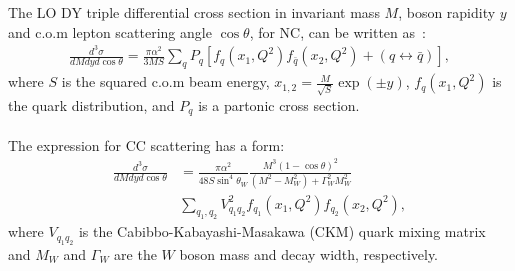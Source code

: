 The LO DY triple differential cross section in
invariant mass \(M\), boson rapidity \(y\) and c.o.m 
lepton scattering  angle \(\cos\theta\), for NC, 
can be written as~\cite{Drell:1970wh,Yamada:1981mw}:
\begin{align}
 \textstyle
 \frac{d^3\sigma}{dM{d}y d\cos\theta} =  
 \frac{\pi\alpha^2}{3MS}\sum_{q}P_q \left[f_q(x_1,Q^2)f_{\bar{q}}(x_2,Q^2) 
 + (q\leftrightarrow\bar{q})\right],
\end{align}
where \(S\) is the squared c.o.m beam energy, \(x_{1,2} = \frac{M}{\sqrt{S}}\exp(\pm y)\), $f_q(x_1,Q^2)$ 
is the quark distribution, and 
$P_q$ is a partonic cross section. 
%
\\
\\
The expression for CC  scattering has a form:
\begin{align}
\frac{d^3\sigma}{dMdyd\cos\theta} &=
 \frac{\pi\alpha^2}{48S\sin^4\theta_W}
 \frac{M^3(1-\cos\theta)^2}{(M^2-M_W^2)+\Gamma_W^2M_W^2}  \nonumber \\
 & \sum_{q_1,q_2}V_{q_1q_2}^2f_{q_1}(x_1,Q^2)f_{q_2}(x_2,Q^2),
\end{align}
where \(V_{q_1q_2}\) is the Cabibbo-Kabayashi-Masakawa (CKM) quark mixing matrix and \(M_W\) and \(\Gamma_W\)
are the \(W\) boson mass and decay width, respectively.

